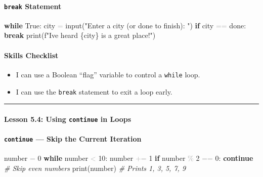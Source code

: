 \documentclass[
  justified,
  openright,
]{tufte-book}
\let\subsection\paragraph
\let\paragraph\paragraph
\newcommand{\KeywordTok}[1]{\textcolor{CodeKeyword}{\textbf{#1}}}  %
\newcommand{\StringTok}[1]{\textcolor{CodeString}{#1}}              %
\newcommand{\CommentTok}[1]{\textcolor{CodeComment}{\textit{#1}}}  %
\newcommand{\CodeNumTok}[1]{\textcolor{CodeNumber}{#1}}             %
\newcommand{\OperatorTok}[1]{\textcolor{DarkGray}{#1}}              %
\newenvironment{Shaded}{%
  \begin{mdframed}[style=TufteCode]%
}{%
  \end{mdframed}%
}
\let\subsection\paragraph
\let\paragraph\paragraph
\providecommand{\tightlist}{%
  \setlength{\itemsep}{0pt}\setlength{\parskip}{0pt}}
\begin{document}
\subsection{\texorpdfstring{\texttt{break}
Statement}{break Statement}}\label{break-statement}

\begin{Shaded}
\begin{Highlighting}[]
\KeywordTok{while} True:
    city \OperatorTok{=} input(\StringTok{"Enter a city (or \textquotesingle{}done\textquotesingle{} to finish): "})
    \KeywordTok{if} city \OperatorTok{==} \StringTok{\textquotesingle{}done\textquotesingle{}}:
        \KeywordTok{break}
    print(\StringTok{f"I\textquotesingle{}ve heard }\StringTok{\{}city\StringTok{\}}\StringTok{ is a great place!"})
\end{Highlighting}
\end{Shaded}

\subsection{Skills Checklist}\label{skills-checklist-24}

\begin{itemize}
\tightlist
\item[$\square$]
  I can use a Boolean ``flag'' variable to control a \texttt{while}
  loop.
\item[$\square$]
  I can use the \texttt{break} statement to exit a loop early.
\end{itemize}

\begin{center}\rule{0.5\linewidth}{0.5pt}\end{center}

\subsection{\texorpdfstring{Lesson 5.4: Using \texttt{continue} in
Loops}{Lesson 5.4: Using continue in Loops}}\label{lesson-5.4-using-continue-in-loops}

\subsection{\texorpdfstring{\texttt{continue} --- Skip the Current
Iteration}{continue --- Skip the Current Iteration}}\label{continue-skip-the-current-iteration}

\begin{Shaded}
\begin{Highlighting}[]
number \OperatorTok{=} \CodeNumTok{0}
\KeywordTok{while} number \OperatorTok{\textless{}} \CodeNumTok{10}:
    number \OperatorTok{+=} \CodeNumTok{1}
    \KeywordTok{if} number \OperatorTok{\%} \CodeNumTok{2} \OperatorTok{==} \CodeNumTok{0}:
        \KeywordTok{continue}        \CommentTok{\# Skip even numbers}
    print(number)       \CommentTok{\# Prints 1, 3, 5, 7, 9}
\end{Highlighting}
\end{Shaded}
\end{document}
